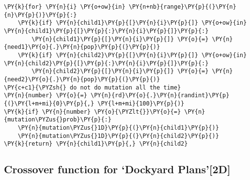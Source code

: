\begin{tcolorbox}[breakable, size=fbox, boxrule=1pt, pad at break*=1mm,colback=cellbackground, colframe=cellborder]
\begin{Verbatim}[commandchars=\\\{\}]
\PY{k}{for} \PY{n}{i} \PY{o+ow}{in} \PY{n+nb}{range}\PY{p}{(}\PY{n}{n}\PY{p}{)}\PY{p}{:}
    \PY{k}{if} \PY{n}{child1}\PY{p}{[}\PY{n}{i}\PY{p}{]} \PY{o+ow}{in} \PY{n}{child1}\PY{p}{[}\PY{p}{:}\PY{n}{i}\PY{p}{]}\PY{p}{:}
        \PY{n}{child1}\PY{p}{[}\PY{n}{i}\PY{p}{]} \PY{o}{=} \PY{n}{need1}\PY{o}{.}\PY{n}{pop}\PY{p}{(}\PY{p}{)}
    \PY{k}{if} \PY{n}{child2}\PY{p}{[}\PY{n}{i}\PY{p}{]} \PY{o+ow}{in} \PY{n}{child2}\PY{p}{[}\PY{p}{:}\PY{n}{i}\PY{p}{]}\PY{p}{:}
        \PY{n}{child2}\PY{p}{[}\PY{n}{i}\PY{p}{]} \PY{o}{=} \PY{n}{need2}\PY{o}{.}\PY{n}{pop}\PY{p}{(}\PY{p}{)}
\PY{c+c1}{\PYZsh{} do not do mutation all the time}
\PY{n}{number} \PY{o}{=} \PY{n}{rd}\PY{o}{.}\PY{n}{randint}\PY{p}{(}\PY{l+m+mi}{0}\PY{p}{,} \PY{l+m+mi}{100}\PY{p}{)}
\PY{k}{if} \PY{n}{number} \PY{o}{\PYZlt{}}\PY{o}{=} \PY{n}{mutation\PYZus{}prob}\PY{p}{:}
    \PY{n}{mutation\PYZus{}1D}\PY{p}{(}\PY{n}{child1}\PY{p}{)}
    \PY{n}{mutation\PYZus{}1D}\PY{p}{(}\PY{n}{child2}\PY{p}{)}
\PY{k}{return} \PY{n}{child1}\PY{p}{,} \PY{n}{child2}
\end{Verbatim}
\end{tcolorbox}

\subsection*{Crossover function for `Dockyard
Plans'{[}2D{]}}\label{crossover-function-for-dockyard-plans2d}


